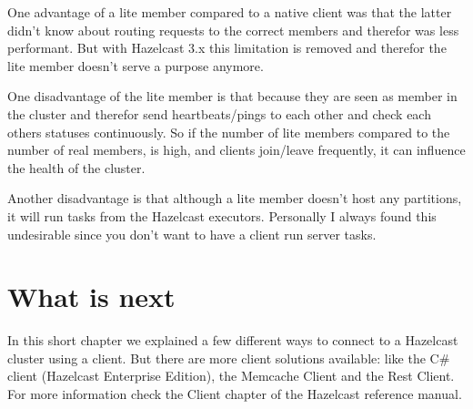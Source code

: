 One advantage of a lite member compared to a native client was that the latter didn't know about routing requests to the correct members and therefor was less performant. But with Hazelcast 3.x this limitation is removed and therefor the lite member doesn't serve a purpose anymore.

One disadvantage of the lite member is that because they are seen as member in the cluster and therefor send heartbeats/pings to each other and check each others statuses continuously. So if the number of lite members compared to the number of real members, is high, and clients join/leave frequently, it can influence the health of the cluster. 

Another disadvantage is that although a lite member doesn't host any partitions, it will run tasks from the Hazelcast executors. Personally I always found this undesirable since you don't want to have a client run server tasks.

\section{What is next}
In this short chapter we explained a few different ways to connect to a Hazelcast cluster using a client. But there are more client solutions available: like the C\# client (Hazelcast Enterprise Edition), the Memcache Client and the Rest Client. For more information check the Client chapter of the Hazelcast reference manual.